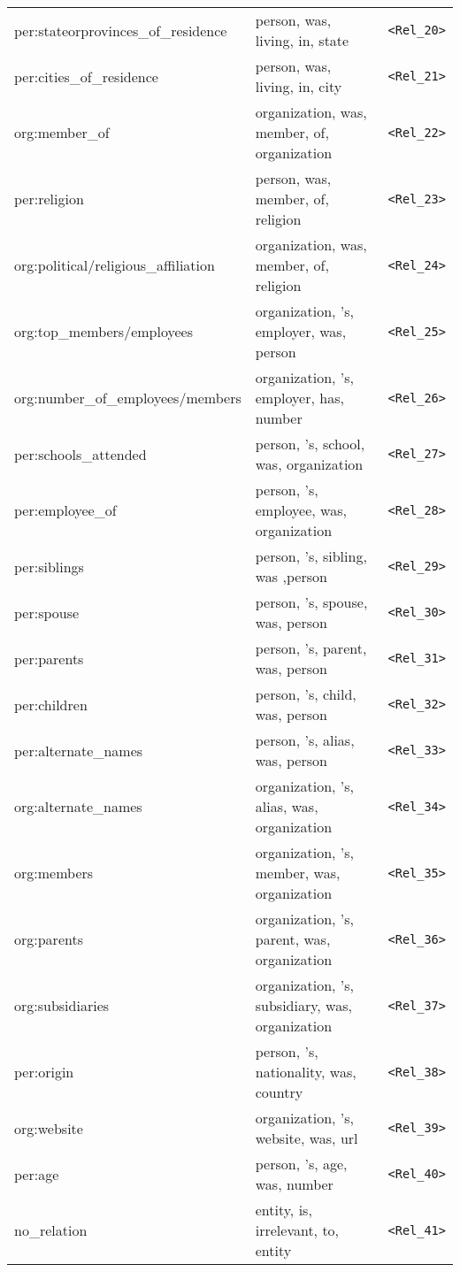 \documentclass[11pt]{article}
\begin{document}
\begin{table*}[t]
{\begin{tabular}{lll}
			per:stateorprovinces\_of\_residence&		person,	was,	living,	in,	state&\texttt{<Rel\_20>} \\
			per:cities\_of\_residence	&	person,	was,	living,	in,	city&\texttt{<Rel\_21>} \\
			org:member\_of	&	organization,	was,	member,	of,	organization&\texttt{<Rel\_22>} \\
			per:religion&		person,	was,	member,	of,	religion&\texttt{<Rel\_23>} \\
			org:political/religious\_affiliation	&	organization,	was,	member,	of,	religion&\texttt{<Rel\_24>} \\
			org:top\_members/employees&		organization,	's,	employer,	was,	person&\texttt{<Rel\_25>} \\
			org:number\_of\_employees/members	&	organization,	's,	employer,	has,	number&\texttt{<Rel\_26>} \\	
			per:schools\_attended &person,	's,	school,	was, organization&\texttt{<Rel\_27>} \\
			per:employee\_of	&person,	's,	employee,	was,	organization&\texttt{<Rel\_28>} \\
			per:siblings&	person,	's,	sibling,	was	,person&\texttt{<Rel\_29>} \\
			per:spouse	&person,	's,	spouse,	was,	person&\texttt{<Rel\_30>} \\
			per:parents	&person,	's,	parent,	was,	person&\texttt{<Rel\_31>} \\
			per:children&	person,	's,	child,	was,	person&\texttt{<Rel\_32>} \\
			per:alternate\_names	&person,	's,	alias,	was,	person&\texttt{<Rel\_33>} \\
			org:alternate\_names	&organization,	's,	alias,	was,	organization&\texttt{<Rel\_34>} \\
			org:members	&organization,	's,	member,	was,	organization&\texttt{<Rel\_35>} \\
			org:parents	&organization,	's,	parent,	was,	organization&\texttt{<Rel\_36>} \\
			org:subsidiaries&	organization,	's,	subsidiary,	was, organization&\texttt{<Rel\_37>} \\
			per:origin	&person,	's,	nationality,	was, country&\texttt{<Rel\_38>} \\
			org:website	&organization,	's,	website,  was,	url&\texttt{<Rel\_39>} \\
			per:age	&person,	's,	age,	was,	number&\texttt{<Rel\_40>} \\
			no\_relation&	entity,	is,	irrelevant,	to,	entity&\texttt{<Rel\_41>} \\
			\bottomrule
		\end{tabular}
	}
	\caption{Hand-crafted label words with fixed length (5) for relations in TACRED.}
	\label{handmade-labels}
\end{table*}
\end{document}
